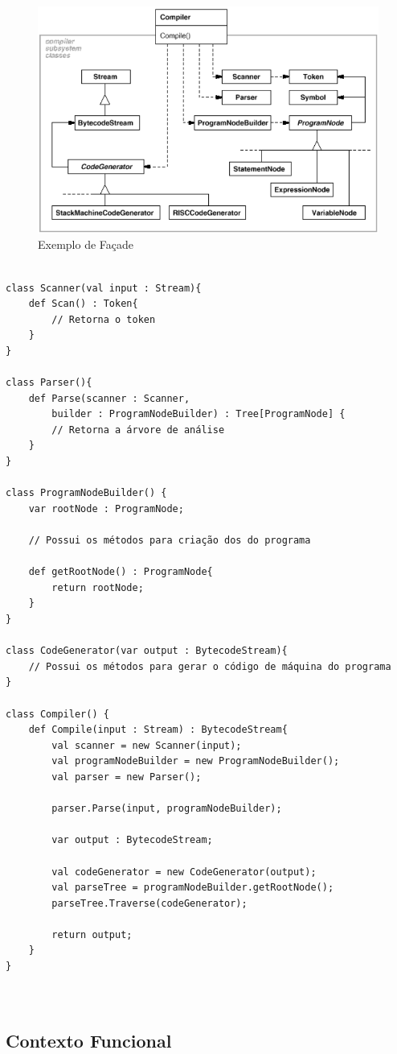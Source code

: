 \begin{figure}[htb]
	\caption{\label{facade_exemplo}Exemplo de Façade}
	\begin{center}
	    \includegraphics[scale=0.4]{5_padroes-contexto-funcional/5.2_estruturais/5.2.5_facade/facade_exemplo.png}
	\end{center}
\end{figure}


\begin{lstlisting}[caption={Façade Orientado a Objetos},label=oofacade]

class Scanner(val input : Stream){
	def Scan() : Token{
		// Retorna o token
	}
}

class Parser(){
	def Parse(scanner : Scanner, 
		builder : ProgramNodeBuilder) : Tree[ProgramNode] {
		// Retorna a árvore de análise
	}
}

class ProgramNodeBuilder() {
	var rootNode : ProgramNode;

	// Possui os métodos para criação dos do programa

	def getRootNode() : ProgramNode{
		return rootNode;
	}
}

class CodeGenerator(var output : BytecodeStream){
	// Possui os métodos para gerar o código de máquina do programa
}

class Compiler() {
	def Compile(input : Stream) : BytecodeStream{
		val scanner = new Scanner(input);
		val programNodeBuilder = new ProgramNodeBuilder();
		val parser = new Parser();

		parser.Parse(input, programNodeBuilder);

		var output : BytecodeStream;

		val codeGenerator = new CodeGenerator(output);
		val parseTree = programNodeBuilder.getRootNode();
		parseTree.Traverse(codeGenerator);

		return output;
	}
}



\end{lstlisting}

\subsection*{Contexto Funcional}


\begin{lstlisting}[caption={Façade Funcional},label=fpfacade]
    

    
\end{lstlisting}